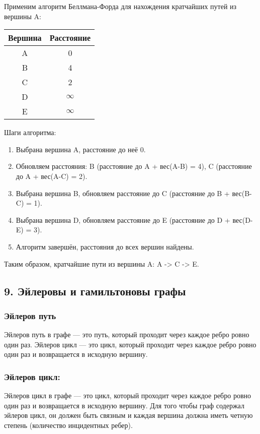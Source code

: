 \documentclass{article}
\begin{document}
Применим алгоритм Беллмана-Форда для нахождения кратчайших путей из вершины A:

\begin{center}
\begin{tabular}{|c|c|}
\hline
Вершина & Расстояние \\
\hline
A & 0 \\
B & 4 \\
C & 2 \\
D & $\infty$ \\
E & $\infty$ \\
\hline
\end{tabular}
\end{center}

\pagebreak
Шаги алгоритма:

\begin{enumerate}
    \item Выбрана вершина A, расстояние до неё 0.
    \item Обновляем расстояния: B (расстояние до A + вес(A-B) = 4), C (расстояние до A + вес(A-C) = 2).
    \item Выбрана вершина B, обновляем расстояние до C (расстояние до B + вес(B-C) = 1).
    \item Выбрана вершина D, обновляем расстояние до E (расстояние до D + вес(D-E) = 3).
    \item Алгоритм завершён, расстояния до всех вершин найдены.
\end{enumerate}

Таким образом, кратчайшие пути из вершины A: A -> C -> E.
\pagebreak

\subsection*{9.  Эйлеровы и гамильтоновы графы }
\subsubsection*{Эйлеров путь}
Эйлеров путь в графе — это путь, который проходит через каждое ребро ровно один раз. Эйлеров цикл — это цикл, который проходит через каждое ребро ровно один раз и возвращается в исходную вершину.

\subsubsection*{Эйлеров цикл:}

Эйлеров цикл в графе — это цикл, который проходит через каждое ребро ровно один раз и возвращается в исходную вершину.
Для того чтобы граф содержал эйлеров цикл, он должен быть связным и каждая вершина должна иметь четную степень (количество инцидентных ребер).
\end{document}
